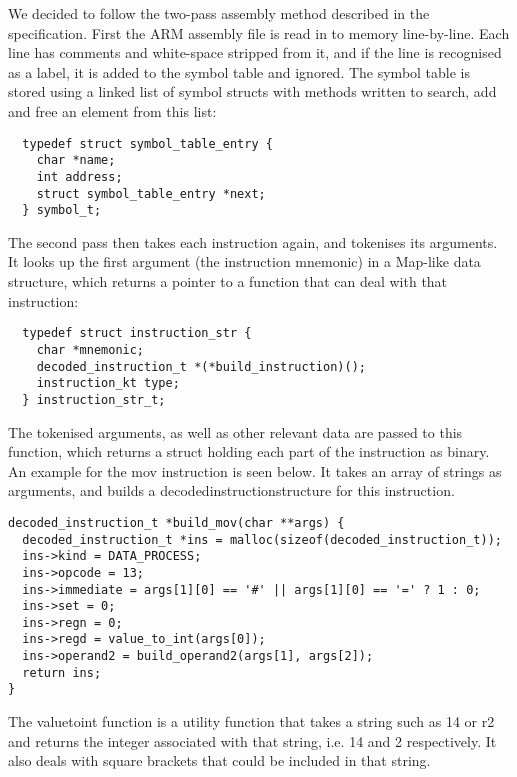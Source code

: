 We decided to follow the two-pass assembly method described in the specification. First the ARM assembly file is read in to memory line-by-line. Each line has comments and white-space stripped from it, and if the line is recognised as a label, it is added to the symbol table and ignored. The symbol table is stored using a linked list of symbol structs with methods written to search, add and free an element from this list:

\begin{verbatim}
  typedef struct symbol_table_entry {
    char *name;
    int address;
    struct symbol_table_entry *next;
  } symbol_t;
\end{verbatim}


The second pass then takes each instruction again, and tokenises its arguments. It looks up the first argument (the instruction mnemonic) in a Map-like data structure, which returns a pointer to a function that can deal with that instruction:

\begin{verbatim}
  typedef struct instruction_str {
    char *mnemonic;
    decoded_instruction_t *(*build_instruction)();
    instruction_kt type;
  } instruction_str_t;
\end{verbatim}

The tokenised arguments, as well as other relevant data are passed to this function, which returns a struct holding each part of the instruction as binary. An example for the mov instruction is seen below. It takes an array of strings as arguments, and builds a decoded\textunderscore{}instruction\textunderscore{}structure for this instruction. 

\begin{verbatim}
decoded_instruction_t *build_mov(char **args) {
  decoded_instruction_t *ins = malloc(sizeof(decoded_instruction_t));
  ins->kind = DATA_PROCESS;
  ins->opcode = 13;
  ins->immediate = args[1][0] == '#' || args[1][0] == '=' ? 1 : 0;
  ins->set = 0;
  ins->regn = 0;
  ins->regd = value_to_int(args[0]);
  ins->operand2 = build_operand2(args[1], args[2]);
  return ins;
}
\end{verbatim}

The value\textunderscore{}to\textunderscore{}int function is a utility function that takes a string such as 14 or r2 and returns the integer associated with that string, i.e. 14 and 2 respectively. It also deals with square brackets that could be included in that string. 
~\\

